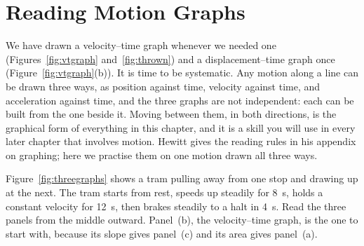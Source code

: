 \section{Reading Motion Graphs}
\label{sec:graphs}

We have drawn a velocity--time graph whenever we needed one (Figures~\ref{fig:vtgraph} and~\ref{fig:thrown}) and a displacement--time graph once (Figure~\ref{fig:vtgraph}(b)). It is time to be systematic. Any motion along a line can be drawn three ways, as position against time, velocity against time, and acceleration against time, and the three graphs are not independent: each can be built from the one beside it. Moving between them, in both directions, is the graphical form of everything in this chapter, and it is a skill you will use in every later chapter that involves motion. Hewitt gives the reading rules in his appendix on graphing; here we practise them on one motion drawn all three ways.

Figure~\ref{fig:threegraphs} shows a tram pulling away from one stop and drawing up at the next. The tram starts from rest, speeds up steadily for \SI{8}{\second}, holds a constant velocity for \SI{12}{\second}, then brakes steadily to a halt in \SI{4}{\second}. Read the three panels from the middle outward. Panel~(b), the velocity--time graph, is the one to start with, because its slope gives panel~(c) and its area gives panel~(a).

